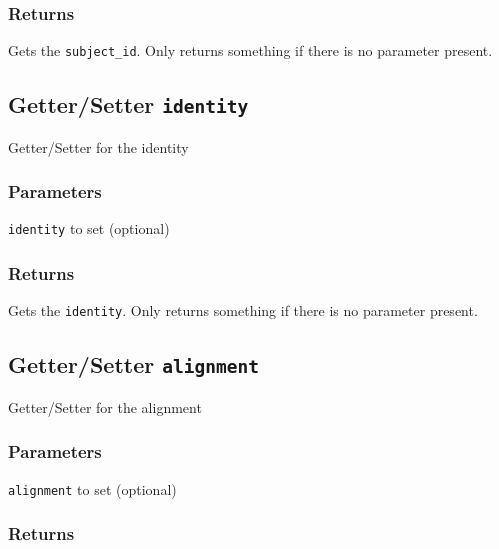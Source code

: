 \subsubsection*{Returns\label{Returns}}


Gets the \texttt{subject\_id}. Only returns something if there is no parameter present.

\subsection*{Getter/Setter \texttt{identity}\label{Getter_Setter_identity}}


Getter/Setter for the identity

\subsubsection*{Parameters\label{Parameters}}
\begin{description}

\item[{\texttt{identity} to set (optional)}] \mbox{}\end{description}
\subsubsection*{Returns\label{Returns}}


Gets the \texttt{identity}. Only returns something if there is no parameter present.

\subsection*{Getter/Setter \texttt{alignment}\label{Getter_Setter_alignment}}


Getter/Setter for the alignment

\subsubsection*{Parameters\label{Parameters}}
\begin{description}

\item[{\texttt{alignment} to set (optional)}] \mbox{}\end{description}
\subsubsection*{Returns\label{Returns}}


